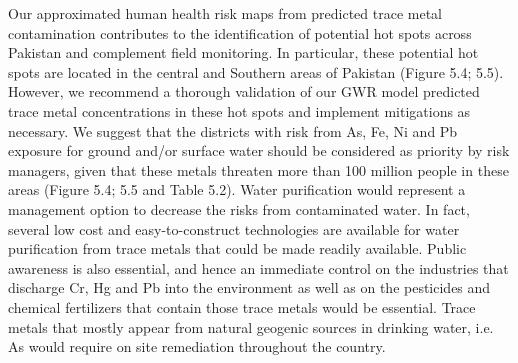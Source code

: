 Our approximated human health risk maps from predicted trace metal contamination contributes to the identification of potential hot spots across Pakistan and complement field monitoring. In particular, these potential hot spots are located in the central and Southern areas of Pakistan (Figure 5.4; 5.5). However, we recommend a thorough validation of our GWR model predicted trace metal concentrations in these hot spots and implement mitigations as necessary. We suggest that the districts with risk from As, Fe, Ni and Pb exposure for ground and/or surface water should be considered as priority by risk managers, given that these metals threaten more than 100 million people in these areas (Figure 5.4; 5.5 and Table 5.2). Water purification would represent a management option to decrease the risks from contaminated water. In fact, several low cost and easy-to-construct technologies are available for water purification from trace metals that could be made readily available. Public awareness is also essential, and hence an immediate control on the industries that discharge Cr, Hg and Pb into the environment as well as on the pesticides and chemical fertilizers that contain those trace metals would be essential. Trace metals that mostly appear from natural geogenic sources in drinking water, i.e. As would require on site remediation throughout the country.

\begingroup

\renewcommand{\addcontentsline}[3]{}%

